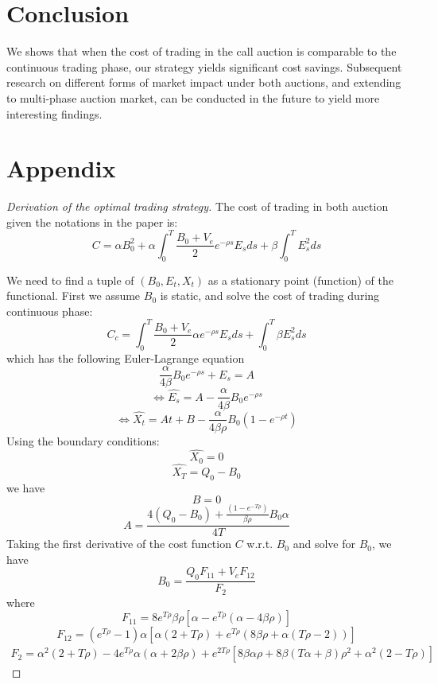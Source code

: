 \documentclass{article}
\begin{document}


\section{Conclusion}\label{secConclusion}
We shows that when the cost of trading in the call auction is comparable to the continuous trading phase, our strategy yields significant cost savings. Subsequent research on different forms of market impact under both auctions, and extending to multi-phase auction market, can be conducted in the future to yield more interesting findings.

\section{Appendix}

\begin{proof}[Derivation of the optimal trading strategy]\label{proof:optimal-strategy}
  The cost of trading in both auction given the notations in the paper is:
  \[
    C = \alpha B_0^2  + \alpha \int_0^T \frac{B_0 + V_e}{2} e^{-\rho s} E_s ds + \beta \int_0^T E_s^2 ds
  \]

  We need to find a tuple of $(B_0, E_t, X_t)$ as a stationary point (function) of the functional. First we assume $B_0$ is static, and solve the cost of trading during continuous phase:
  \[
    C_c = \int_0^T \frac{B_0 + V_e}{2} \alpha e^{-\rho s} E_s ds + \int_0^T  \beta E_s^2 ds
  \]
  which has the following Euler-Lagrange equation
  \[
    \frac{\alpha}{4 \beta} B_0  e^{-\rho s} +E_s = A
  \]
  \[
    \Leftrightarrow \hat{E_s} = A - \frac{\alpha}{4 \beta} B_0 e^{-\rho s}
  \]
  \[
    \Leftrightarrow \hat{X_t} = At + B - \frac{\alpha}{4 \beta \rho}B_ 0 (1 - e^{-\rho t})
  \]
  Using the boundary conditions:
  \[
    \hat{X_0} = 0
  \]
  \[
    \hat{X_T} = Q_0 - B_0
  \]
  we have
  \[
    B = 0
  \]
  \[
    A = \frac{4 (Q_0 - B_0) + \frac{(1 - e^{-T \rho})}{\beta \rho} B_0 \alpha} {4 T}
  \]
  Taking the first derivative of the cost function $C$ w.r.t. $B_0$ and solve for $B_0$, we have
  \[
    B_0 = \frac{Q_0 F_{11} + V_e F_{12}}{F_2}
  \]
  where
  \[
    F_{11} = 8 e^{T \rho} \beta \rho [\alpha - e^{T \rho} (\alpha - 4 \beta \rho)]
  \]
  \[
    F_{12} = (e^{T \rho}-1) \alpha [\alpha (2+T \rho) + e^{T \rho} (8 \beta \rho + \alpha (T \rho - 2 ))]
  \]
  \[
    \begin{split}
      F_2 = \alpha^2 (2 + T \rho) - 4 e^{T \rho} \alpha (\alpha + 2 \beta \rho)
      + e^{2 T \rho} [8 \beta \alpha \rho + 8 \beta (T \alpha + \beta) \rho^2 + \alpha^2 (2 - T \rho)]
    \end{split}
  \]

\end{proof}



\end{document}
